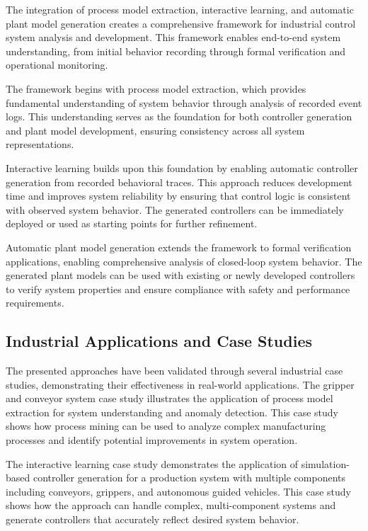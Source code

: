 The integration of process model extraction, interactive learning, and automatic plant model generation creates a comprehensive framework for industrial control system analysis and development. This framework enables end-to-end system understanding, from initial behavior recording through formal verification and operational monitoring.

The framework begins with process model extraction, which provides fundamental understanding of system behavior through analysis of recorded event logs. This understanding serves as the foundation for both controller generation and plant model development, ensuring consistency across all system representations.

Interactive learning builds upon this foundation by enabling automatic controller generation from recorded behavioral traces. This approach reduces development time and improves system reliability by ensuring that control logic is consistent with observed system behavior. The generated controllers can be immediately deployed or used as starting points for further refinement.

Automatic plant model generation extends the framework to formal verification applications, enabling comprehensive analysis of closed-loop system behavior. The generated plant models can be used with existing or newly developed controllers to verify system properties and ensure compliance with safety and performance requirements.

\subsection{Industrial Applications and Case Studies}

The presented approaches have been validated through several industrial case studies, demonstrating their effectiveness in real-world applications. The gripper and conveyor system case study illustrates the application of process model extraction for system understanding and anomaly detection. This case study shows how process mining can be used to analyze complex manufacturing processes and identify potential improvements in system operation.

The interactive learning case study demonstrates the application of simulation-based controller generation for a production system with multiple components including conveyors, grippers, and autonomous guided vehicles. This case study shows how the approach can handle complex, multi-component systems and generate controllers that accurately reflect desired system behavior.

